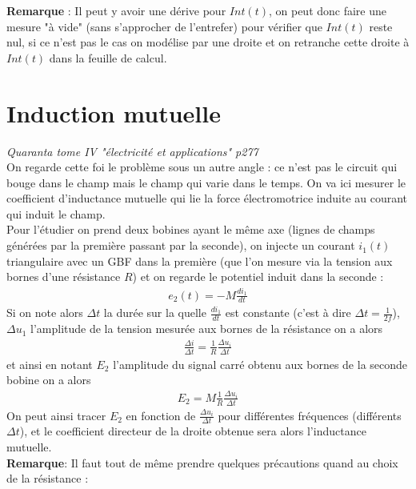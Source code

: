 \documentclass[12pt,prb,aps,epsf]{article}
\begin{document}
\textbf{Remarque} : Il peut y avoir une dérive pour $Int(t)$, on peut donc faire une mesure "à vide" (sans s'approcher de l'entrefer) pour vérifier que $Int(t)$ reste nul, si ce n'est pas le cas on modélise par une droite et on retranche cette droite à $Int(t)$ dans la feuille de calcul.

\section{Induction mutuelle}
\textit{Quaranta tome IV "électricité et applications" p277}\\

On regarde cette foi le problème sous un autre angle : ce n'est pas le circuit qui bouge dans le champ mais le champ qui varie dans le temps. On va ici mesurer le coefficient d'inductance mutuelle qui lie la force électromotrice induite au courant qui induit le champ.\\
Pour l'étudier on prend deux bobines ayant le même axe (lignes de champs générées par la première passant par la seconde), on injecte un courant $i_1(t)$ triangulaire avec un GBF dans la première (que l'on mesure via la tension aux bornes d'une résistance $R$) et on regarde le potentiel induit dans la seconde : 
\begin{eqnarray}
e_2(t) = -M\frac{di_1}{dt}
\end{eqnarray}
Si on note alors $\Delta t$ la durée sur la quelle $\frac{di_1}{dt}$ est constante (c'est à dire $\Delta t =\frac{1}{2f}$), $\Delta u_1$ l'amplitude de la tension mesurée aux bornes de la résistance on a alors 
\begin{eqnarray}
\frac{\Delta i}{\Delta t} = \frac{1}{R}\frac{\Delta u_i}{\Delta t}
\end{eqnarray}
et ainsi en notant $E_2$ l'amplitude du signal carré obtenu aux bornes de la seconde bobine on a alors 
\begin{eqnarray}
E_2 = M\frac{1}{R}\frac{\Delta u_i}{\Delta t}
\end{eqnarray}
On peut ainsi tracer $E_2$ en fonction de $\frac{\Delta u_i}{\Delta t}$ pour différentes fréquences (différents $\Delta t$), et le coefficient directeur de la droite obtenue sera alors l'inductance mutuelle.\\

\textbf{Remarque}: Il faut tout de même prendre quelques précautions quand au choix de la résistance :\\
\end{document}
